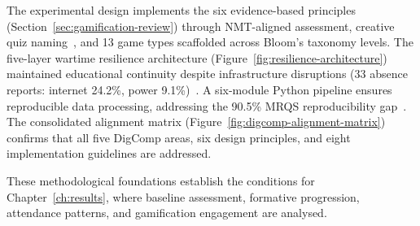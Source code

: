 The experimental design implements the six evidence-based principles (Section~\ref{sec:gamification-review}) through NMT-aligned assessment, creative quiz naming~\cite{Sailer2017}, and 13 game types scaffolded across Bloom's taxonomy levels. The five-layer wartime resilience architecture (Figure~\ref{fig:resilience-architecture}) maintained educational continuity despite infrastructure disruptions (33 absence reports: internet 24.2\%, power 9.1\%)~\cite{Burde2017}. A six-module Python pipeline ensures reproducible data processing, addressing the 90.5\% MRQS reproducibility gap~\cite{Korniienko2025mrqs}. The consolidated alignment matrix (Figure~\ref{fig:digcomp-alignment-matrix}) confirms that all five DigComp areas, six design principles, and eight implementation guidelines are addressed.

These methodological foundations establish the conditions for Chapter~\ref{ch:results}, where baseline assessment, formative progression, attendance patterns, and gamification engagement are analysed.
